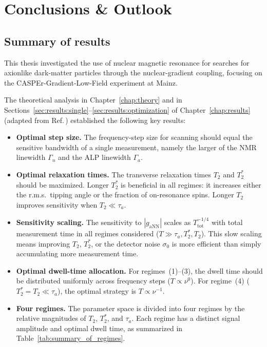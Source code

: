\chapter{Conclusions \& Outlook}

\section{Summary of results}

This thesis investigated the use of nuclear magnetic resonance for searches for axionlike dark-matter particles through the nuclear-gradient coupling, focusing on the CASPEr-Gradient-Low-Field experiment at Mainz.

The theoretical analysis in Chapter~\ref{chap:theory} and in Sections~\ref{sec:results:single}--\ref{sec:results:optimization} of Chapter~\ref{chap:results} (adapted from Ref.\,\cite{Yuzhe2023_FrequencyScanning}) established the following key results:

\begin{itemize}
    \item \textbf{Optimal step size.} The frequency-step size for scanning should equal the sensitive bandwidth of a single measurement, namely the larger of the NMR linewidth $\Gamma_n$ and the ALP linewidth $\Gamma_a$.

    \item \textbf{Optimal relaxation times.} The transverse relaxation times $T_2$ and $T_2^*$ should be maximized. Longer $T_2^*$ is beneficial in all regimes: it increases either the r.m.s.\ tipping angle or the fraction of on-resonance spins. Longer $T_2$ improves sensitivity when $T_2 \ll \tau_a$.

    \item \textbf{Sensitivity scaling.} The sensitivity to $|g_{\mathrm{aNN}}|$ scales as $T_{\mathrm{tot}}^{-1/4}$ with total measurement time in all regimes considered ($T \gg \tau_a, T_2^*, T_2$). This slow scaling means improving $T_2$, $T_2^*$, or the detector noise $\sigma_0$ is more efficient than simply accumulating more measurement time.

    \item \textbf{Optimal dwell-time allocation.} For regimes~(1)--(3), the dwell time should be distributed uniformly across frequency steps ($T \propto \nu^0$). For regime~(4) ($T_2^*=T_2 \ll \tau_a$), the optimal strategy is $T \propto \nu^{-1}$.

    \item \textbf{Four regimes.} The parameter space is divided into four regimes by the relative magnitudes of $T_2$, $T_2^*$, and $\tau_a$. Each regime has a distinct signal amplitude and optimal dwell time, as summarized in Table~\ref{tab:summary_of_regimes}.
\end{itemize}

